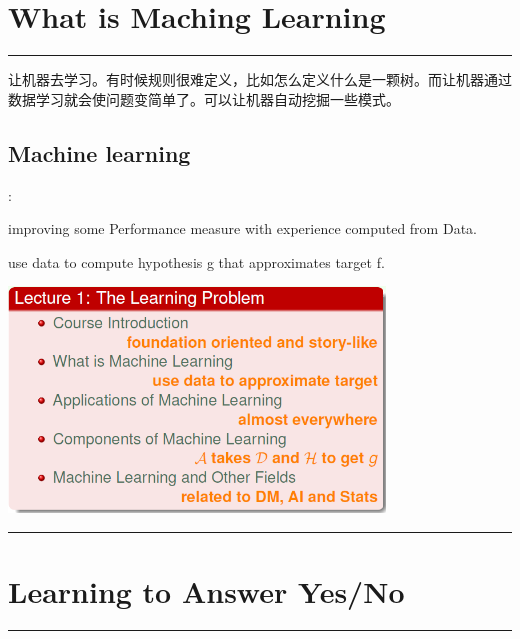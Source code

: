 \documentclass{article}
\begin{document}
\section{What is Maching Learning}
\noindent
{\color{LightRubineRed} \rule{\linewidth}{1mm} }
让机器去学习。有时候规则很难定义，比如怎么定义什么是一颗树。而让机器通过数据学习就会使问题变简单了。可以让机器自动挖掘一些模式。\par
\subsection{Machine learning}: \par
improving some Performance measure with experience computed from Data. \par
use \textcolor{Mycolor1}{data} to compute hypothesis g that \textcolor{Mycolor1}{approximates} target f. \par

\begin{center}
\includegraphics[width=10cm, height=6cm]{lecture1_sum}\\
\end{center}

\noindent
{\color{RubineRed} \rule{\linewidth}{1mm} }
\section{Learning to Answer Yes/No} %
\noindent
{\color{LightRubineRed} \rule{\linewidth}{1mm} }
\end{document}
